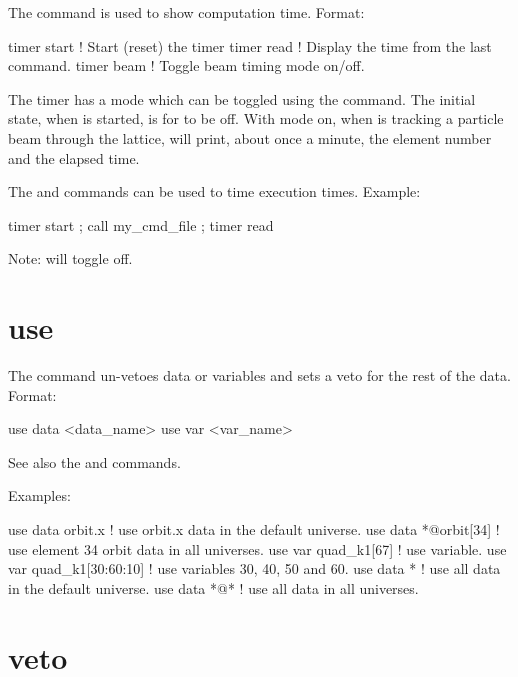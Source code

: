 {{{{{{{{{The  command is used to show computation time. Format:
\begin{example}
  timer start      ! Start (reset) the timer
  timer read       ! Display the time from the last  command.    
  timer beam       ! Toggle beam timing mode on/off.
\end{example}
The timer has a  mode which can be toggled using the 
command. The initial state, when \tao is started, is for  to be off. With
 mode on, when \tao is tracking a particle beam through the lattice, \tao
will print, about once a minute, the element number and the elapsed time.

The  and  commands can be used to time execution
times. Example:
\begin{example}
  timer start ; call my_cmd_file ; timer read
\end{example}

Note:  will toggle  off.

\section{use}
\label{s:use}

The  command un-vetoes data or variables and sets a veto for the rest of the
data. Format:
\begin{example}
  use data  <data_name>
  use var <var_name>
\end{example}

\vskip 7pt 

See also the  and  commands.

Examples:
\begin{example}
  use data orbit.x             ! use orbit.x data in the default universe.
  use data *@orbit[34]         ! use element 34 orbit data in all universes.
  use var quad_k1[67]          ! use variable.
  use var quad_k1[30:60:10]    ! use variables 30, 40, 50 and 60.
  use data *                   ! use all data in the default universe.
  use data *@*                 ! use all data in all universes.
\end{example}


\section{veto}
\label{s:veto}

}}}}}}}}}
